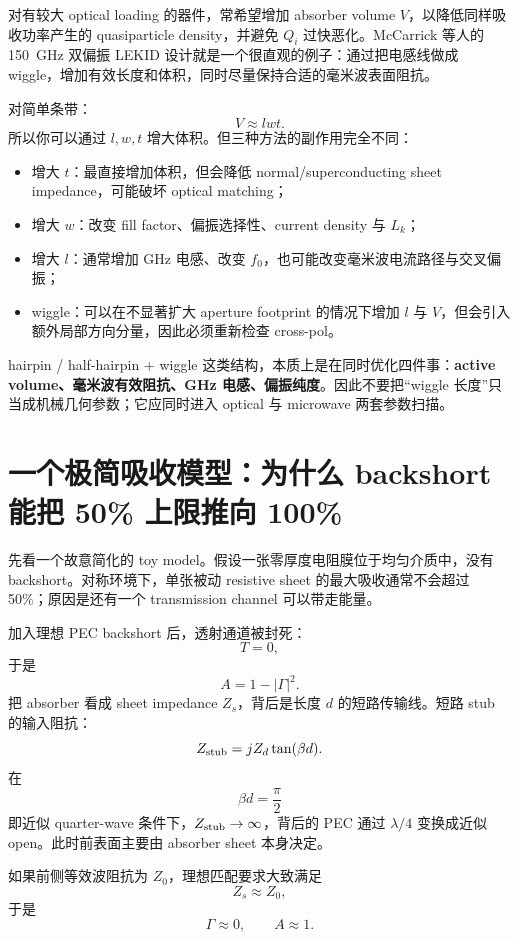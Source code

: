 \documentclass[11pt,a4paper,openany]{ctexrep}
\begin{document}
对有较大 optical loading 的器件，常希望增加 absorber volume $V$，以降低同样吸收功率产生的 quasiparticle density，并避免 $Q_i$ 过快恶化。McCarrick 等人的 \SI{150}{GHz} 双偏振 LEKID 设计就是一个很直观的例子：通过把电感线做成 wiggle，增加有效长度和体积，同时尽量保持合适的毫米波表面阻抗。

对简单条带：
\[
V\approx lwt.
\]
所以你可以通过 $l,w,t$ 增大体积。但三种方法的副作用完全不同：
\begin{itemize}
  \item 增大 $t$：最直接增加体积，但会降低 normal/superconducting sheet impedance，可能破坏 optical matching；
  \item 增大 $w$：改变 fill factor、偏振选择性、current density 与 $L_k$；
  \item 增大 $l$：通常增加 GHz 电感、改变 $f_0$，也可能改变毫米波电流路径与交叉偏振；
  \item wiggle：可以在不显著扩大 aperture footprint 的情况下增加 $l$ 与 $V$，但会引入额外局部方向分量，因此必须重新检查 cross-pol。
\end{itemize}

\begin{projectbox}
hairpin / half-hairpin + wiggle 这类结构，本质上是在同时优化四件事：\textbf{active volume、毫米波有效阻抗、GHz 电感、偏振纯度}。因此不要把“wiggle 长度”只当成机械几何参数；它应同时进入 optical 与 microwave 两套参数扫描。
\end{projectbox}

\section{一个极简吸收模型：为什么 backshort 能把 50\% 上限推向 100\%}

先看一个故意简化的 toy model。假设一张零厚度电阻膜位于均匀介质中，没有 backshort。对称环境下，单张被动 resistive sheet 的最大吸收通常不会超过 50\%；原因是还有一个 transmission channel 可以带走能量。

加入理想 PEC backshort 后，透射通道被封死：
\[
T=0,
\]
于是
\[
A=1-|\Gamma|^2.
\]
把 absorber 看成 sheet impedance $Z_s$，背后是长度 $d$ 的短路传输线。短路 stub 的输入阻抗：
\[
Z_{\rm stub}=jZ_d\tan(\beta d).
\]
在
\[
\beta d=\frac{\pi}{2}
\]
即近似 quarter-wave 条件下，$Z_{\rm stub}\rightarrow\infty$，背后的 PEC 通过 $\lambda/4$ 变换成近似 open。此时前表面主要由 absorber sheet 本身决定。

如果前侧等效波阻抗为 $Z_0$，理想匹配要求大致满足
\[
\boxed{Z_s\approx Z_0,}
\]
于是
\[
\Gamma\approx0,\qquad A\approx1.
\]
\end{document}
